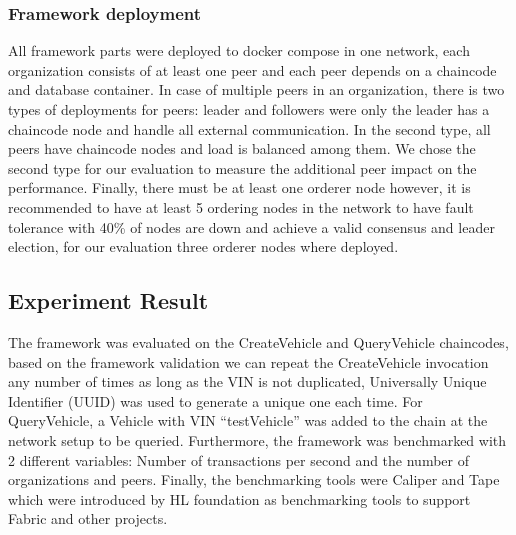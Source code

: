 \subsubsection{Framework deployment}
All framework parts were deployed to docker compose in one network, each organization consists of at least one peer and each peer depends
on a chaincode and database container.
In case of multiple peers in an organization, there is two types of deployments for peers: leader
and followers were only the leader has a chaincode node and handle all external communication.
In the second type, all peers have chaincode nodes and load is balanced among them.
We chose the second type for our evaluation to measure the additional peer impact on the performance.
Finally, there must be at least one orderer node however, it is recommended to have at least 5 ordering nodes in the network to
have fault tolerance with 40\% of nodes are down and achieve a valid consensus and leader election, for our evaluation three orderer
nodes where deployed.

\subsection{Experiment Result}\label{subsec:experiment-result}
The framework was evaluated on the CreateVehicle and QueryVehicle chaincodes, based on the framework validation we can repeat the
CreateVehicle invocation any number of times as long as the VIN is not duplicated, Universally Unique Identifier (UUID) was
used to generate a unique one each time.
For QueryVehicle, a Vehicle with VIN “testVehicle” was added to the chain at the network setup to be queried.
Furthermore, the framework was benchmarked with 2 different variables: Number of transactions per second and the number of
organizations
and peers.
Finally, the benchmarking tools were Caliper and Tape which were introduced by HL foundation as benchmarking tools
to support Fabric and other projects.

